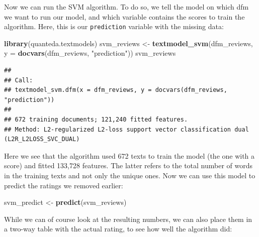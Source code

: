 \documentclass[
]{book}
\newenvironment{Shaded}{\begin{snugshade}}{\end{snugshade}}
\newcommand{\AttributeTok}[1]{\textcolor[rgb]{0.13,0.29,0.53}{#1}}
\newcommand{\FunctionTok}[1]{\textcolor[rgb]{0.13,0.29,0.53}{\textbf{#1}}}
\newcommand{\NormalTok}[1]{#1}
\newcommand{\OtherTok}[1]{\textcolor[rgb]{0.56,0.35,0.01}{#1}}
\newcommand{\SpecialCharTok}[1]{\textcolor[rgb]{0.81,0.36,0.00}{\textbf{#1}}}
\newcommand{\StringTok}[1]{\textcolor[rgb]{0.31,0.60,0.02}{#1}}
\begin{document}
Now we can run the SVM algorithm. To do so, we tell the model on which dfm we want to run our model, and which variable contains the scores to train the algorithm. Here, this is our \texttt{prediction} variable with the missing data:

\begin{Shaded}
\begin{Highlighting}[]
\FunctionTok{library}\NormalTok{(quanteda.textmodels)}
\NormalTok{svm\_reviews }\OtherTok{\textless{}{-}} \FunctionTok{textmodel\_svm}\NormalTok{(dfm\_reviews, }\AttributeTok{y =} \FunctionTok{docvars}\NormalTok{(dfm\_reviews, }\StringTok{"prediction"}\NormalTok{))}
\NormalTok{svm\_reviews}
\end{Highlighting}
\end{Shaded}

\begin{verbatim}
## 
## Call:
## textmodel_svm.dfm(x = dfm_reviews, y = docvars(dfm_reviews, "prediction"))
## 
## 672 training documents; 121,240 fitted features.
## Method: L2-regularized L2-loss support vector classification dual (L2R_L2LOSS_SVC_DUAL)
\end{verbatim}

Here we see that the algorithm used 672 texts to train the model (the one with a score) and fitted 133,728 features. The latter refers to the total number of words in the training texts and not only the unique ones. Now we can use this model to predict the ratings we removed earlier:

\begin{Shaded}
\begin{Highlighting}[]
\NormalTok{svm\_predict }\OtherTok{\textless{}{-}} \FunctionTok{predict}\NormalTok{(svm\_reviews)}
\end{Highlighting}
\end{Shaded}

While we can of course look at the resulting numbers, we can also place them in a two-way table with the actual rating, to see how well the algorithm did:

\begin{Shaded}
\end{Shaded}
\end{document}
